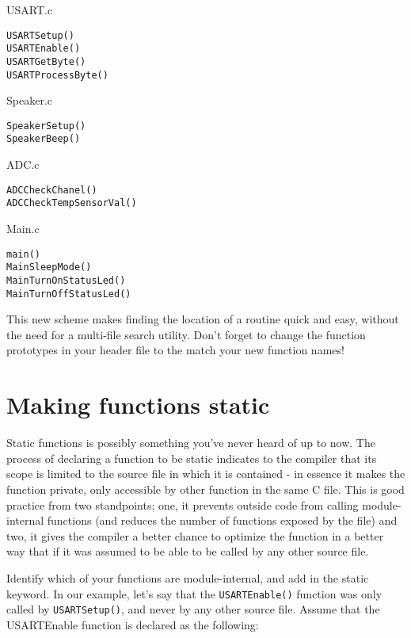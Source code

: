 \documentclass[a4paper,oneside]{book}
\begin{document}
USART.c
\begin{center}
\begin{lstlisting}
USARTSetup()
USARTEnable()
USARTGetByte()
USARTProcessByte()
\end{lstlisting}
\end{center}

Speaker.c
\begin{center}
\begin{lstlisting}
SpeakerSetup()
SpeakerBeep()
\end{lstlisting}
\end{center}

ADC.c
\begin{center}
\begin{lstlisting}
ADCCheckChanel()
ADCCheckTempSensorVal()
\end{lstlisting}
\end{center}

Main.c
\begin{center}
\begin{lstlisting}
main()
MainSleepMode()
MainTurnOnStatusLed()
MainTurnOffStatusLed()
\end{lstlisting}
\end{center}

This new scheme makes finding the location of a routine quick and easy, without the need for a multi-file search utility. Don't forget to change the function prototypes in your header file to the match your new function names!

\section{Making functions static}

Static functions is possibly something you've never heard of up to now. The process of declaring a function to be static indicates to the compiler that its scope is limited to the source file in which it is contained - in essence it makes the function private, only accessible by other function in the same C file. This is good practice from two standpoints; one, it prevents outside code from calling module-internal functions (and reduces the number of functions exposed by the file) and two, it gives the compiler a better chance to optimize the function in a better way that if it was assumed to be able to be called by any other source file.

Identify which of your functions are module-internal, and add in the static keyword. In our example, let's say that the \texttt{USARTEnable()} function was only called by \texttt{USARTSetup()}, and never by any other source file. Assume that the USARTEnable function is declared as the following:
\end{document}
